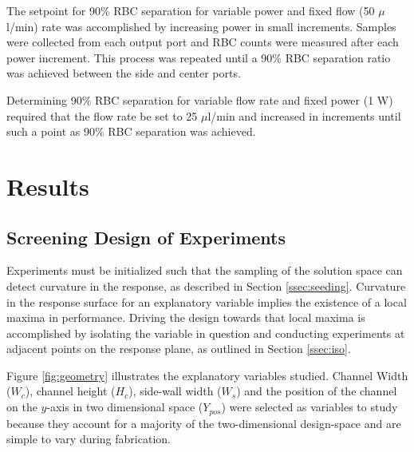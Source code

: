 The setpoint for 90\% RBC separation for variable power and fixed flow (50 $\mu$l/min) rate was accomplished by increasing power in small increments. Samples were collected from each output port and RBC counts were measured after each power increment. This process was repeated until a 90\% RBC separation ratio was achieved between the side and center ports.

Determining 90\% RBC separation for variable flow rate and fixed power (1 W) required that the flow rate be set to 25 $\mu$l/min and increased in increments until such a point as 90\% RBC separation was achieved.  

\section{Results}
\label{sec:results}

\subsection{Screening Design of Experiments}
\label{ssec:doe}
Experiments must be initialized such that the sampling of the solution space can detect curvature in the response, as described in Section \ref{ssec:seeding}. Curvature in the response surface for an explanatory variable implies the existence of a local maxima in performance. Driving the design towards that local maxima is accomplished by isolating the variable in question and conducting experiments at adjacent points on the response plane, as outlined in Section \ref{ssec:iso}. 

Figure \ref{fig:geometry} illustrates the explanatory variables studied. Channel Width ($W_c$), channel height ($H_c$), side-wall width ($W_s$) and the position of the channel on the $y$-axis in two dimensional space ($Y_{pos}$) were selected as variables to study because they account for a majority of the two-dimensional design-space and are simple to vary during fabrication.

